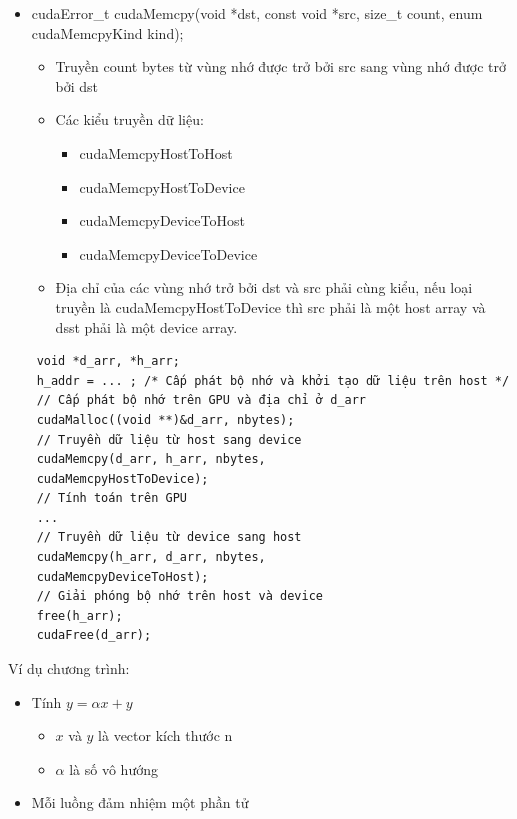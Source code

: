 \documentclass[14pt, a4paper]{article}
\numberwithin{equation}{section}
\numberwithin{figure}{section}
\numberwithin{dl}{section}
\numberwithin{md}{section}
\numberwithin{bd}{section}
\numberwithin{dn}{section}
\numberwithin{hq}{section}
\begin{document}
\begin{itemize}
    \item cudaError\_t cudaMemcpy(void *dst, const void *src, size\_t count,
                                  enum cudaMemcpyKind kind);

    \begin{itemize}
        \item Truyền count bytes từ vùng nhớ được trở bởi src sang vùng nhớ được trở bởi dst
        \item Các kiểu truyền dữ liệu:
        \begin{itemize}
            \item cudaMemcpyHostToHost
            \item cudaMemcpyHostToDevice
            \item cudaMemcpyDeviceToHost
            \item cudaMemcpyDeviceToDevice
        \end{itemize}
        \item Địa chỉ của các vùng nhớ trở bởi dst và src phải cùng kiểu, nếu loại truyền là cudaMemcpyHostToDevice thì src phải là một host array và dsst phải là một device array.
    \end{itemize}
\end{itemize}

\begin{verbatim}
    void *d_arr, *h_arr;
    h_addr = ... ; /* Cấp phát bộ nhớ và khởi tạo dữ liệu trên host */
    // Cấp phát bộ nhớ trên GPU và địa chỉ ở d_arr
    cudaMalloc((void **)&d_arr, nbytes);
    // Truyền dữ liệu từ host sang device
    cudaMemcpy(d_arr, h_arr, nbytes,
    cudaMemcpyHostToDevice);
    // Tính toán trên GPU
    ...
    // Truyền dữ liệu từ device sang host
    cudaMemcpy(h_arr, d_arr, nbytes,
    cudaMemcpyDeviceToHost);
    // Giải phóng bộ nhớ trên host và device
    free(h_arr);
    cudaFree(d_arr);
\end{verbatim}

Ví dụ chương trình:

\begin{itemize}
    \item Tính $y=\alpha x + y$
    \begin{itemize}
        \item $x$ và $y$ là vector kích thước n
        \item $\alpha$ là số vô hướng
    \end{itemize}
    \item Mỗi luồng đảm nhiệm một phần tử
\end{itemize}
\end{document}
